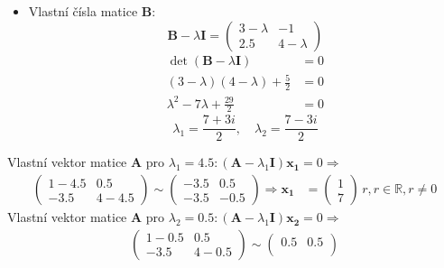 \begin{example}
    \begin{itemize}
      \item Vlastní čísla matice \textbf{B}:
        \begin{equation*}
             \textbf{B} - \lambda\textbf{I}=
               \begin{pmatrix}
                 3-\lambda  & -1             \\
                 2.5        &  4-\lambda
               \end{pmatrix}
        \end{equation*}
        \begin{align*}
           \det(\mathbf{B}-\lambda\mathbf{I}) &= 0 \\
           (3-\lambda)(4-\lambda)+\frac{5}{2} &= 0 \\
           \lambda^2-7\lambda+\frac{29}{2}    &= 0
        \end{align*}
        \begin{equation*}
           \lambda_1 = \frac{7+3i}{2},\quad \lambda_2 = \frac{7-3i}{2}
        \end{equation*}
    \end{itemize}
  Vlastní vektor matice \(\mathbf{A}\) pro \(\lambda_1=4.5: (\mathbf{A} - 
  \lambda_1\mathbf{I})\mathbf{x_1} = 0 \Rightarrow\)
  \begin{align*}
    \begin{pmatrix}
       1  -4.5  &  0.5     \\
      -3.5      &  4-4.5
    \end{pmatrix}
    \sim
    \begin{pmatrix}
      -3.5  &  0.5         \\
      -3.5  & -0.5
    \end{pmatrix}
    \Rightarrow\mathbf{x_1} &=
    \begin{pmatrix}
      1 \\ 7
    \end{pmatrix}
    \, r, r\in\mathbb{R}, r\neq0
  \end{align*}
  Vlastní vektor matice \(\mathbf{A}\) pro \(\lambda_2=0.5: (\mathbf{A} - 
  \lambda_1\mathbf{I})\mathbf{x_2}=0 \Rightarrow\)
  \begin{align*}
    \begin{pmatrix}
       1  -0.5  &  0.5   \\
      -3.5      &  4-0.5
    \end{pmatrix}
    \sim
    \begin{pmatrix}
       0.5  &  0.5       \\

\end{pmatrix}
\end{align*}
\end{example}

